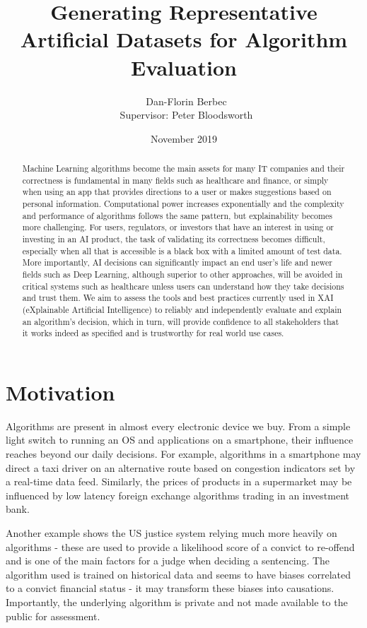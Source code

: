 \documentclass[proposal]{softeng}
\title{Generating Representative Artificial Datasets for Algorithm Evaluation}
\author{\ Dan-Florin Berbec \\ \ Supervisor: Peter Bloodsworth}
\date{November 2019}
\begin{document}
\maketitle

\newpage
\clearpage\mbox{}\clearpage

\begin{abstract}
Machine Learning algorithms become the main assets for many IT companies and their correctness is fundamental in many fields such as healthcare and finance, or simply when using an app that provides directions to a user or makes suggestions based on personal information. Computational power increases exponentially and the complexity and performance of algorithms follows the same pattern, but explainability becomes more challenging. For users, regulators, or investors that have an interest in using or investing in an AI product, the task of validating its correctness becomes difficult, especially when all that is accessible is a black box with a limited amount of test data. More importantly, AI decisions can significantly impact an end user's life and newer fields such as Deep Learning, although superior to other approaches, will be avoided in critical systems such as healthcare unless users can understand how they take decisions and trust them. We aim to assess the tools and best practices currently used in XAI (eXplainable Artificial Intelligence) to reliably and independently evaluate and explain an algorithm's decision, which in turn, will provide confidence to all stakeholders that it works indeed as specified and is trustworthy for real world use cases.\end{abstract}
 
\tableofcontents
\newpage

\section{Motivation}
Algorithms are present in almost every electronic device we buy. From a simple light switch to running an OS and applications on a smartphone, their influence reaches beyond our daily decisions. For example, algorithms in a smartphone may direct a taxi driver on an alternative route based on congestion indicators set by a real-time data feed. Similarly, the prices of products in a supermarket may be influenced by low latency foreign exchange algorithms trading in an investment bank.

Another example shows the US justice system relying much more heavily on algorithms - these are used to provide a likelihood score of a convict to re-offend and is one of the main factors for a judge when deciding a sentencing\cite{jail}. The algorithm used is trained on historical data and seems to have biases correlated to a convict financial status - it may transform these biases into causations. Importantly, the underlying algorithm is private and not made available to the public for assessment.
\end{document}
